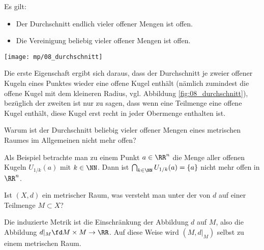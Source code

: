 \begin{antwort}
  Es gilt: 
  {\setlength{\labelsep}{6mm}
    \begin{itemize} 
    \item[\desc{O1}] Der Durchschnitt endlich vieler offener Mengen ist offen.
      \\[-4mm]
    \item[\desc{O2}] Die Vereinigung beliebig vieler offener Mengen ist offen.
    \end{itemize}}

  \begin{center}
    \texttt{[image: mp/08\_durchschnitt]}
    \label{fig:08_durchschnitt}
  \end{center}

  Die erste Eigenschaft ergibt sich daraus, dass der Durchschnitt je zweier 
  offener Kugeln eines Punktes wieder eine offene Kugel enthält 
  (nämlich zumindest die offene Kugel mit dem kleineren Radius, vgl. 
  Abbildung \ref{fig:08_durchschnitt}), 
  bezüglich der zweiten ist nur zu sagen, dass wenn eine Teilmenge eine 
  offene Kugel enthält, diese Kugel erst recht in jeder Obermenge 
  enthalten ist.  
  \AntEnd
\end{antwort}

\begin{frage}
  Warum ist der Durchschnitt beliebig vieler 
  offener Mengen eines metrischen Raumes im Allgemeinen nicht mehr offen?
\end{frage}

\begin{antwort}
  Als Beispiel betrachte man zu einem Punkt $a\in \RR^n$ die Menge 
  aller offenen Kugeln $U_{1/k}(a)$ mit $k\in \NN$. Dann ist $
  \bigcap_{k\in\NN} U_{1/k} (a) = \{ a \}$
  nicht mehr offen in $\RR^n$. 
  \AntEnd 
\end{antwort}

\begin{frage}
  Ist $(X,d)$ ein metrischer Raum, was versteht man unter der 
  von $d$  auf einer Teilmenge $M\subset X$?
\end{frage}

\begin{antwort}
  Die induzierte Metrik ist die Einschränkung der Abbildung 
  $d$ auf $M$, also die Abbildung $d|_M \fd M\times M \to \RR$. 
  Auf diese Weise wird $(M, d|_M)$ selbst zu einem metrischen Raum.
  \AntEnd
\end{antwort}

